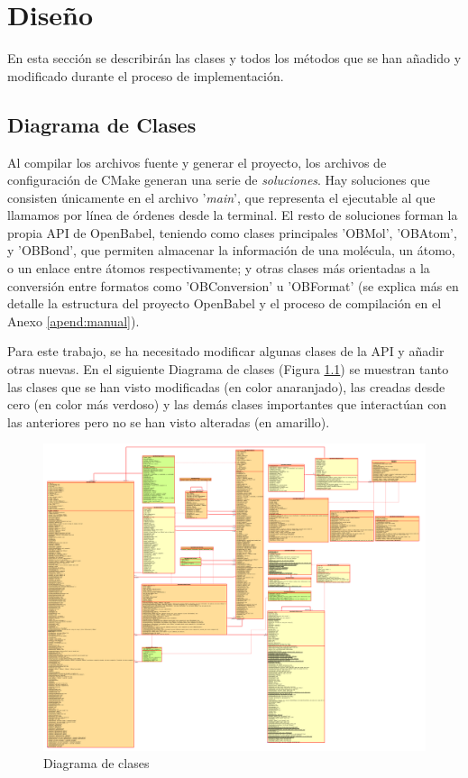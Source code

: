 \chapter{Diseño}

En esta sección se describirán las clases y todos los métodos que se han añadido y modificado durante el proceso de implementación.

\section{Diagrama de Clases}
Al compilar los archivos fuente y generar el proyecto, los archivos de configuración de CMake generan una serie de \emph{soluciones}. Hay soluciones que consisten únicamente en el archivo '\textit{main}', que representa el ejecutable al que llamamos por línea de órdenes desde la terminal. El resto de soluciones forman la propia API de OpenBabel, teniendo como clases principales 'OBMol', 'OBAtom', y 'OBBond', que permiten almacenar la información de una molécula, un átomo, o un enlace entre átomos respectivamente; y otras clases más orientadas a la conversión entre formatos como 'OBConversion' u 'OBFormat' (se explica más en detalle la estructura del proyecto OpenBabel y el proceso de compilación en el Anexo \ref{apend:manual}).

Para este trabajo, se ha necesitado modificar algunas clases de la API y añadir otras nuevas. En el siguiente Diagrama de clases (Figura \ref{fig:diagrama_clases}) se muestran tanto las clases que se han visto modificadas (en color anaranjado), las creadas desde cero (en color más verdoso) y las demás clases importantes que interactúan con las anteriores pero no se han visto alteradas (en amarillo).

\begin{landscape}

    \begin{figure}[]
        \centering
        \includegraphics[scale=0.7]{imagenes/diseno/diagramaClasesHorizontal_cropped.pdf}
        \caption{Diagrama de clases}
        \label{fig:diagrama_clases}
    \end{figure}
\end{landscape}

